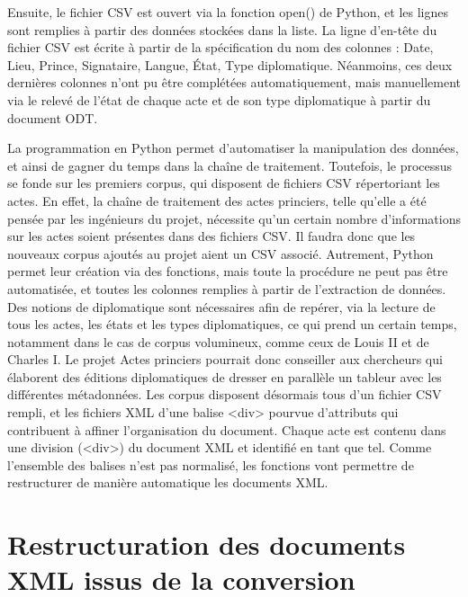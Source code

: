 \par Ensuite, le fichier CSV est ouvert via la fonction \og open() \fg \space de Python, et les lignes sont remplies à partir des données stockées dans la liste. La ligne d'en-tête du fichier CSV est écrite à partir de la spécification du nom des colonnes : \og Date\fg, \og Lieu\fg, \og Prince\fg, \og Signataire\fg, \og Langue\fg, \og État\fg, \og Type diplomatique\fg. Néanmoins, ces deux dernières colonnes n'ont pu être complétées automatiquement, mais manuellement via le relevé de l'état de chaque acte et de son type diplomatique à partir du document ODT.
\newline 

\par La programmation en Python permet d'automatiser la manipulation des données, et ainsi de gagner du temps dans la chaîne de traitement. Toutefois, le processus se fonde sur les premiers corpus, qui disposent de fichiers CSV répertoriant les actes. En effet, la chaîne de traitement des actes princiers, telle qu'elle a été pensée par les ingénieurs du projet, nécessite qu'un certain nombre d'informations sur les actes soient présentes dans des fichiers CSV. Il faudra donc que les nouveaux corpus ajoutés au projet aient un CSV associé. Autrement, Python permet leur création via des fonctions, mais toute la procédure ne peut pas être automatisée, et toutes les colonnes remplies à partir de l'extraction de données. Des notions de diplomatique sont nécessaires afin de repérer, via la lecture de tous les actes, les états et les types diplomatiques, ce qui prend un certain temps, notamment dans le cas de corpus volumineux, comme ceux de Louis II et de Charles I. Le projet \og Actes princiers \fg \space pourrait donc conseiller aux chercheurs qui élaborent des éditions diplomatiques de dresser en parallèle un tableur avec les différentes métadonnées. Les corpus disposent désormais tous d'un fichier CSV rempli, et les fichiers XML d'une balise <div> pourvue d'attributs qui contribuent à affiner l'organisation du document. Chaque acte est contenu dans une division (<div>) du document XML et identifié en tant que tel. Comme l'ensemble des balises n'est pas normalisé, les fonctions vont permettre de restructurer de manière automatique les documents XML.
\newpage 

\section[Restructuration des documents XML]{Restructuration des documents XML issus de la conversion}
\label{III.5.2}

